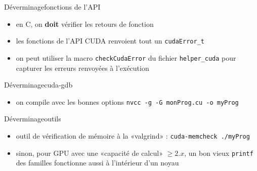 \documentclass[11pt,mathserif]{beamer}
\newcommand{\scout}{\faAngellist}
\newcommand{\argi}{\faLightbulbO}
\newcommand{\adibi}{\faCommentO}
\newcommand{\harritu}{\faExclamation}
\begin{document}
\begin{frame}{Déverminage}{fonctions de l'API}
  \begin{itemize}[<+->]
    \item[\adibi] en C, on {\bf doit} vérifier les retours de fonction 
\begin{center}
  
\end{center}
    \item[\argi] les fonctions de l'API CUDA renvoient tout un \texttt{cudaError\_t}
    \item[\scout] on peut utiliser la macro \lstinline!checkCudaError! du fichier \texttt{helper\_cuda}
      pour capturer les erreurs renvoyées à l'exécution
\begin{center}
  
\end{center}
  \end{itemize}
\end{frame}

\begin{frame}{Déverminage}{cuda-gdb}
  \begin{itemize}[<+->]
        \item on compile avec les bonnes options \texttt{nvcc -g -G monProg.cu -o myProg}
   \end{itemize}
\pause
  
\end{frame}

\begin{frame}{Déverminage}{outils}
  \begin{itemize}[<+->]
    \item outil de vérification de mémoire à la «valgrind» : \texttt{cuda-memcheck ./myProg}
    \item[\scout] sinon, pour GPU avec une «capacité de calcul» $\geqslant 2.x$, un bon vieux \texttt{printf} des familles fonctionne aussi
    à l'intérieur d'un noyau \harritu
  \end{itemize} 
\end{frame}
\end{document}
